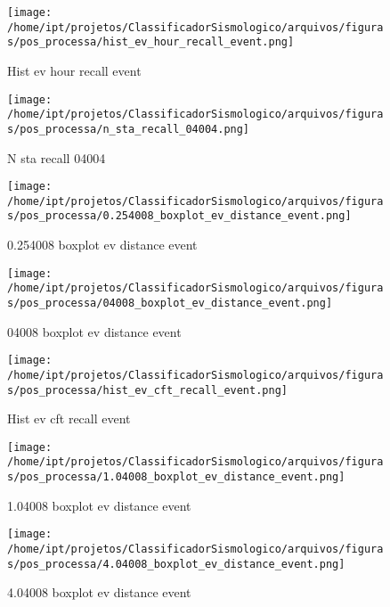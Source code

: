     \begin{figure}[H]
        \centering
        \texttt{[image: /home/ipt/projetos/ClassificadorSismologico/arquivos/figuras/pos\_processa/hist\_ev\_hour\_recall\_event.png]}
        \caption{Hist ev hour recall event}
        \label{fig:hist_ev_hour_recall_event}
    \end{figure}
                

    \begin{figure}[H]
        \centering
        \texttt{[image: /home/ipt/projetos/ClassificadorSismologico/arquivos/figuras/pos\_processa/n\_sta\_recall\_04004.png]}
        \caption{N sta recall 04004}
        \label{fig:n_sta_recall_04004}
    \end{figure}
                

    \begin{figure}[H]
        \centering
        \texttt{[image: /home/ipt/projetos/ClassificadorSismologico/arquivos/figuras/pos\_processa/0.254008\_boxplot\_ev\_distance\_event.png]}
        \caption{0.254008 boxplot ev distance event}
        \label{fig:0.254008_boxplot_ev_distance_event}
    \end{figure}
                

    \begin{figure}[H]
        \centering
        \texttt{[image: /home/ipt/projetos/ClassificadorSismologico/arquivos/figuras/pos\_processa/04008\_boxplot\_ev\_distance\_event.png]}
        \caption{04008 boxplot ev distance event}
        \label{fig:04008_boxplot_ev_distance_event}
    \end{figure}
                

    \begin{figure}[H]
        \centering
        \texttt{[image: /home/ipt/projetos/ClassificadorSismologico/arquivos/figuras/pos\_processa/hist\_ev\_cft\_recall\_event.png]}
        \caption{Hist ev cft recall event}
        \label{fig:hist_ev_cft_recall_event}
    \end{figure}
                

    \begin{figure}[H]
        \centering
        \texttt{[image: /home/ipt/projetos/ClassificadorSismologico/arquivos/figuras/pos\_processa/1.04008\_boxplot\_ev\_distance\_event.png]}
        \caption{1.04008 boxplot ev distance event}
        \label{fig:1.04008_boxplot_ev_distance_event}
    \end{figure}
                

    \begin{figure}[H]
        \centering
        \texttt{[image: /home/ipt/projetos/ClassificadorSismologico/arquivos/figuras/pos\_processa/4.04008\_boxplot\_ev\_distance\_event.png]}
        \caption{4.04008 boxplot ev distance event}
        \label{fig:4.04008_boxplot_ev_distance_event}
    \end{figure}
                